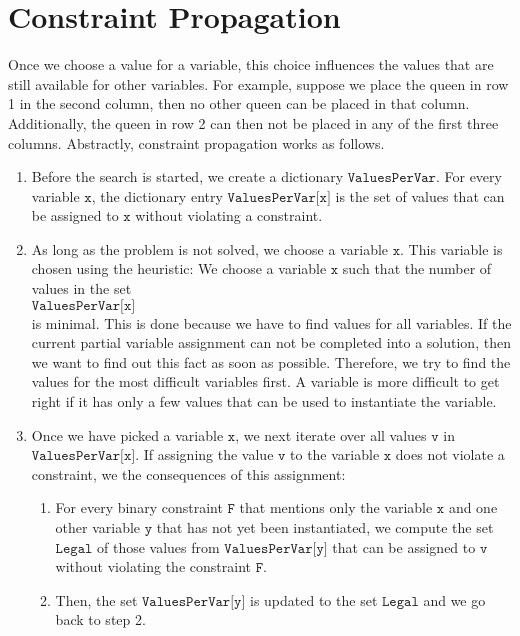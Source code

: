 \section{Constraint Propagation}
Once we choose a value for a variable, this choice influences the values that are still available for other variables.
For example, suppose we place the queen in row 1 in the second column, then no other queen can be placed in
that column.   Additionally, the queen in row 2 can then not be placed in any of the first three columns.
Abstractly, constraint propagation works as follows.
\begin{enumerate}
\item Before the search is started, we create a dictionary $\texttt{ValuesPerVar}$.  For every variable
      $\texttt{x}$, the dictionary entry $\texttt{ValuesPerVar[x]}$ is the set of values that can be assigned to $\texttt{x}$
      without violating a constraint.
\item As long as the problem is not solved,  we choose a variable $\texttt{x}$. 
      This variable is chosen using the  heuristic:  We choose a variable
      $\texttt{x}$ such that the number of values in the set
      \\[0.2cm]
      \hspace*{1.3cm}
      $\texttt{ValuesPerVar[x]}$ 
      \\[0.2cm]
      is minimal.  This is done because we have to
      find values for all variables.  If the current partial variable assignment can not be completed into a
      solution, then we want to find out this fact as soon as possible.  Therefore, we try to find the values
      for the most difficult variables first.  A variable is more difficult to get right if it has only a few
      values that can be used to instantiate the variable.
\item Once we have picked a variable $\texttt{x}$, we next iterate over all values $\texttt{v}$ in
      $\texttt{ValuesPerVar[x]}$.  If assigning the value $\texttt{v}$ to the variable $\texttt{x}$ does not
      violate a constraint, we  the consequences of this assignment:
      \begin{enumerate}
      \item For every binary constraint $\texttt{F}$ that mentions only the variable $\texttt{x}$ and one other variable
            $\texttt{y}$ that has not yet been instantiated, we compute the set $\texttt{Legal}$ of those values from 
            $\texttt{ValuesPerVar[y]}$ that can be assigned to $\texttt{v}$ without violating the constraint
            $\texttt{F}$.
            
      \item Then, the set $\texttt{ValuesPerVar[y]}$ is updated to the set $\texttt{Legal}$ and we go back to
            step 2.
      \end{enumerate}
\end{enumerate}


